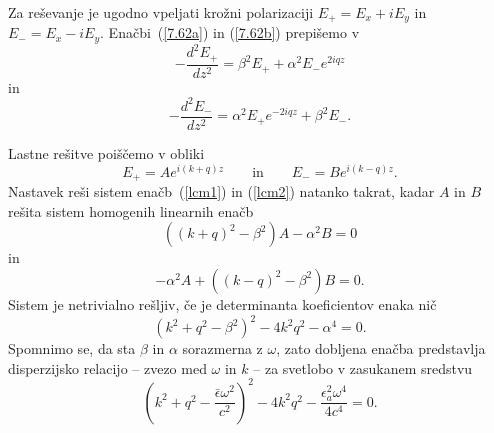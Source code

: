 Za reševanje je ugodno vpeljati krožni polarizaciji 
$E_{+}=E_{x}+iE_{y}$ in $E_{-}=E_{x}-iE_{y}$.
Enačbi~(\ref{7.62a}) in (\ref{7.62b}) prepišemo v
\begin{equation}
-\frac{d^{2}E_{+}}{dz^{2}}=\beta^{2}E_{+}+\alpha^{2}E_{-}e^{2iqz}
\label{lcm1}
\end{equation}
in 
\begin{equation}
-\frac{d^{2}E_{-}}{dz^{2}}=\alpha^{2}E_{+}e^{-2iqz}+\beta^{2}E_{-}.
\label{lcm2}
\end{equation}

Lastne rešitve poiščemo v obliki 
\begin{equation}
E_{+}  =  Ae^{i(k+q)z} 
\qquad
\mathrm{in}
\qquad
E_{-}  =  Be^{i(k-q)z}.
\label{7.65}
\end{equation}
Nastavek reši sistem enačb~(\ref{lcm1}) in (\ref{lcm2}) 
natanko takrat, kadar $A$ in $B$ rešita sistem homogenih linearnih enačb 
\begin{equation}
\left((k+q)^{2}-\beta^{2}\right)A-\alpha^{2}B  =  0 
\label{7.66c}
\end{equation}
in
\begin{equation}
-\alpha^{2}A+\left((k-q)^{2}-\beta^{2}\right)B  =  0.
\label{7.66d}
\end{equation}
 Sistem je netrivialno rešljiv, če je determinanta koeficientov enaka
nič
\begin{equation}
\left(k^{2}+q^{2}-\beta^{2}\right)^{2}-4k^{2}q^{2}-\alpha^{4}=0.
\label{7.66}
\end{equation}
Spomnimo se, da sta $\beta$ in $\alpha$ sorazmerna z $\omega$,
zato dobljena enačba predstavlja disperzijsko relacijo -- zvezo med 
$\omega$ in $k$ -- za svetlobo v zasukanem sredstvu
\begin{equation}
\left(k^{2}+q^{2}-\frac{\bar{\epsilon}\omega^{2}}{c^{2}}\right)^{2}-
4k^{2}q^{2}- \frac{\epsilon_{a}^2\omega^{4}}{4c^{4}}
=0.
\label{7.66a}
\end{equation}

